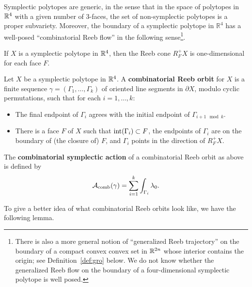 Symplectic polytopes are generic, in the sense that in the space of polytopes in ${\mathbb R}^4$ with a given number of $3$-faces, the set of non-symplectic polytopes is a proper subvariety. Moreover, the boundary of a symplectic polytope in $\mathbb{R}^4$ has a well-posed ``combinatorial Reeb flow'' in the following sense\footnote{There is also a more general notion of ``generalized Reeb trajectory'' on the boundary of a compact convex convex set in ${\mathbb R}^{2n}$ whose interior contains the origin; see Definition~\ref{def:gro} below. We do not know whether the generalized Reeb flow on the boundary of a four-dimensional symplectic polytope is well posed.}.

 \begin{proposition}
 \label{prop:well-posed}
 If $X$ is a symplectic polytope in ${\mathbb R}^4$, then the Reeb cone $R_F^+X$ is one-dimensional for each face $F$.
\end{proposition}

\begin{definition}
\label{def:cro}
Let $X$ be a symplectic polytope in ${\mathbb R}^4$. A {\bf combinatorial Reeb orbit\/} for $X$ is a finite sequence $\gamma=(\Gamma_1,\ldots,\Gamma_k)$ of oriented line segments in $\partial X$, modulo cyclic permutations, such that for each $i=1,\ldots,k$:
\begin{itemize}
\item The final endpoint of $\Gamma_i$ agrees with the initial endpoint of $\Gamma_{i+1\mod k}$.
\item
There is a face $F$ of $X$ such that $\operatorname{int}(\Gamma_i)\subset F$, the endpoints of $\Gamma_i$ are on the boundary of (the closure of) $F$, and $\Gamma_i$ points in the direction of $R_F^+X$.
\end{itemize}
The {\bf combinatorial symplectic action\/} of a combinatorial Reeb orbit as above is defined by
\[
{\mathcal A}_{\operatorname{comb}}(\gamma)=\sum_{i=1}^k\int_{\Gamma_i}\lambda_0.
\]
\end{definition}

To give a better idea of what combinatorial Reeb orbits look like, we have the following lemma. 

